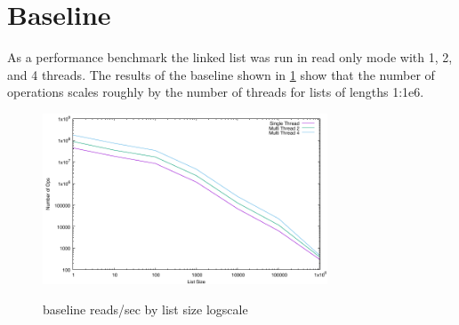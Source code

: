 \documentclass{article}
\begin{document}
\section{Baseline}
As a performance benchmark the linked list was run in read only mode with 1, 2, and 4 
threads. The results of the baseline shown in \ref{f:Fig.1} show that the number 
of operations scales roughly by the number of threads for lists of lengths 1:1e6. 
	\begin{figure}[h]
		\centering
		\includegraphics[height=2in]{outputData/baseline.pdf}
		\label{f:Fig.1}
		\caption{baseline reads/sec by list size logscale}
	\end{figure}
\end{document}

